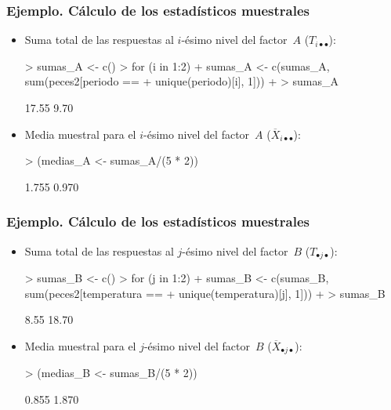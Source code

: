 \begin{frame}[fragile]
\frametitle{Ejemplo. Cálculo de los estadísticos muestrales}
{\small
\begin{itemize}
\item<2-> Suma total de las respuestas al $i$-ésimo nivel del factor~$A$ ($T_{i\bullet\bullet}$):
\begin{Schunk}
\begin{Sinput}
> sumas_A <- c()
> for (i in 1:2) {
+     sumas_A <- c(sumas_A, sum(peces2[periodo == 
+         unique(periodo)[i], 1]))
+ }
> sumas_A
\end{Sinput}
\begin{Soutput}
[1] 17.55  9.70
\end{Soutput}
\end{Schunk}
\item<3-> Media muestral para el $i$-ésimo nivel del factor~$A$ ($\overline{X}_{i\bullet\bullet}$):
\begin{Schunk}
\begin{Sinput}
> (medias_A <- sumas_A/(5 * 2))
\end{Sinput}
\begin{Soutput}
[1] 1.755 0.970
\end{Soutput}
\end{Schunk}
\end{itemize}}
\end{frame}
\begin{frame}[fragile]
\frametitle{Ejemplo. Cálculo de los estadísticos muestrales}
{\small 
\begin{itemize}
\item<2-> Suma total de las respuestas al $j$-ésimo nivel del factor~$B$ ($T_{\bullet j\bullet}$):
\begin{Schunk}
\begin{Sinput}
> sumas_B <- c()
> for (j in 1:2) {
+     sumas_B <- c(sumas_B, sum(peces2[temperatura == 
+         unique(temperatura)[j], 1]))
+ }
> sumas_B
\end{Sinput}
\begin{Soutput}
[1]  8.55 18.70
\end{Soutput}
\end{Schunk}
\item<3-> Media muestral para el $j$-ésimo nivel del factor~$B$ ($\overline{X}_{\bullet j\bullet}$):
\begin{Schunk}
\begin{Sinput}
> (medias_B <- sumas_B/(5 * 2))
\end{Sinput}
\begin{Soutput}
[1] 0.855 1.870
\end{Soutput}
\end{Schunk}
\end{itemize}}
\end{frame}
